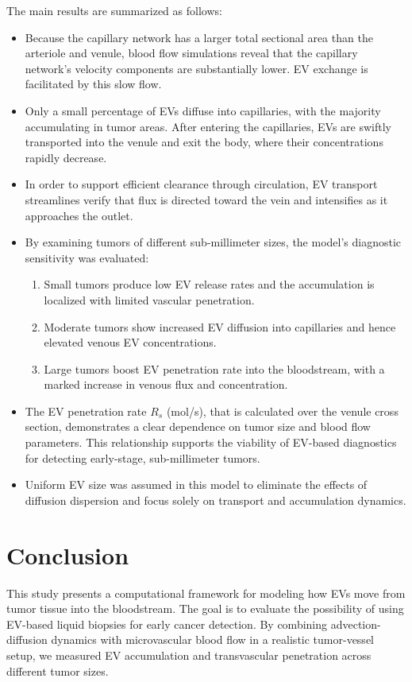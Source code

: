 \documentclass[sigconf]{acmart}
\begin{document}
The main results are summarized as follows:
\begin{itemize}
  \item Because the capillary network has a larger total  sectional area than the arteriole and venule, blood flow simulations reveal that the capillary network's velocity components are substantially lower. EV exchange is facilitated by this slow flow.
  
  \item Only a small percentage of EVs diffuse into capillaries, with the majority accumulating in tumor areas. After entering the capillaries, EVs are swiftly transported into the venule and exit the body, where their concentrations rapidly decrease.
  
  \item In order to support efficient clearance through circulation, EV transport streamlines verify that flux is directed toward the vein and intensifies as it approaches the outlet.
  
  \item By examining tumors of different sub-millimeter sizes, the model's diagnostic sensitivity was evaluated:
  \begin{enumerate}
    \item Small tumors produce low EV release rates and the accumulation is localized with limited vascular penetration.
    \item Moderate tumors show increased EV diffusion into capillaries and hence elevated venous EV concentrations.
    \item Large tumors boost EV penetration rate into the bloodstream, with a marked increase in venous flux and concentration.
  \end{enumerate}
  
  \item The EV penetration rate \( R_s \) (mol/s), that is calculated over the venule cross section, demonstrates a clear dependence on tumor size and blood flow parameters. This relationship supports the viability of EV-based diagnostics for detecting early-stage, sub-millimeter tumors.

  \item Uniform EV size was assumed in this model to eliminate the effects of diffusion dispersion and focus solely on transport and accumulation dynamics.
\end{itemize}


\section{Conclusion}
\label{sec: conclusion}
This study presents a computational framework for modeling how EVs move from tumor tissue into the bloodstream. The goal is to evaluate the possibility of using EV-based liquid biopsies for early cancer detection. By combining advection-diffusion dynamics with microvascular blood flow in a realistic tumor-vessel setup, we measured EV accumulation and transvascular penetration across different tumor sizes.
\end{document}
